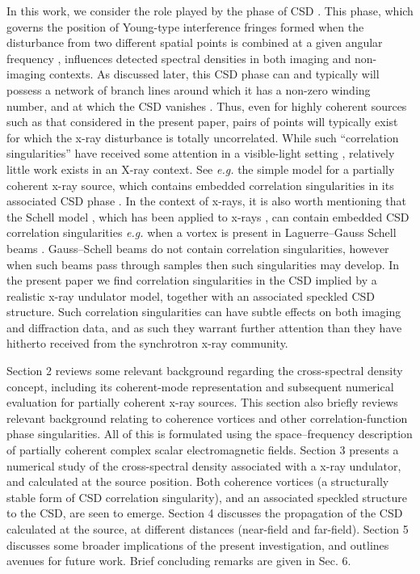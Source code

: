 \documentclass{iucr}              %
\newcommand{\inred}[1]{{\color{red}#1}}
\begin{document}
In this work, we consider the role played by the phase of CSD \cite{Schouten2003,GburVisser2003,Bogatyryova2003}. This phase, which governs the position of Young-type interference fringes formed when the disturbance from two different spatial points is combined at a given angular frequency \cite{mandel_wolf}, influences detected spectral densities in both imaging and non-imaging contexts.  \inred{As discussed later, t}his CSD phase can and typically will possess a network of branch lines around which it has a non-zero winding number, and at which the CSD vanishes \cite{TopologicalReactionsCohVortices,Marasinghe2010}.  Thus, even for highly coherent sources such as that considered in the present paper, pairs of points will typically exist for which the x-ray disturbance is totally uncorrelated.  While such ``correlation singularities'' have received some attention in a visible-light setting \cite{Schouten2003,GburVisser2003,Bogatyryova2003,FischerVisser2004,Palacios2004,GburVisser2006,Wang2006,TopologicalReactionsCohVortices,GburVisser2010,Rodrigo2015}, relatively little work exists in an X-ray context.  See {\em e.g.} the simple model for a partially coherent x-ray source, which contains embedded correlation singularities in its associated CSD phase  \cite{PellicciaPaganin2012}.   In the context of x-rays, it is also worth mentioning that the Schell model \cite{mandel_wolf}, which has been applied to x-rays \cite{Coisson1997,Vartanyants2010}, can contain embedded CSD correlation singularities {\em e.g.} when a vortex is present in Laguerre--Gauss Schell beams \cite{Palacios2004,Rodrigo2015}.  Gauss--Schell beams do not contain correlation singularities, however when such beams pass through samples then such singularities may develop. In the present paper we find correlation singularities in the CSD \inred{implied} by a realistic x-ray undulator model, together with an associated speckled CSD structure. Such correlation singularities can have subtle effects on both imaging and diffraction data, and as such they warrant further attention than they have hitherto received from the synchrotron x-ray community.

Section 2 reviews some relevant background regarding the cross-spectral density concept, including its coherent-mode representation and subsequent numerical evaluation for partially coherent x-ray sources.  This section also briefly reviews relevant background relating to coherence vortices and other correlation-function phase singularities.  All of this is formulated using the space--frequency description of partially coherent complex scalar electromagnetic fields.  Section 3 presents a numerical study of the cross-spectral density associated with a x-ray undulator, and calculated at the source position.  Both coherence vortices (a structurally stable form of CSD correlation singularity), and an associated speckled structure to the CSD, are seen to emerge. Section 4 discusses the propagation of the CSD calculated at the source, at different distances (near-field and far-field). Section 5 discusses some broader implications of the present investigation, and outlines avenues for future work.  Brief concluding remarks are given in Sec. 6.
\end{document}
